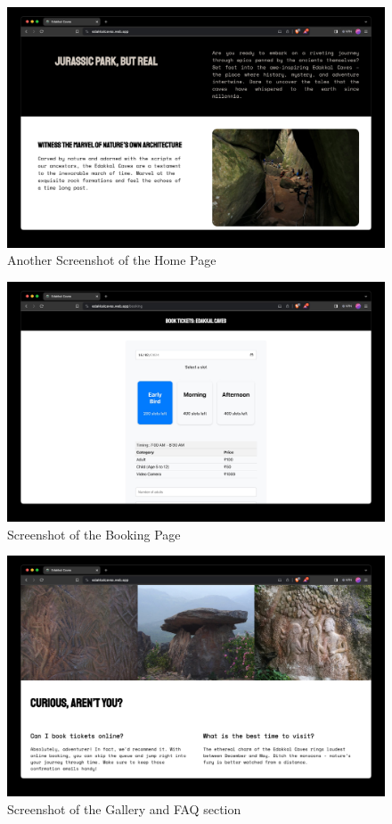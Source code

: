 \documentclass[12pt,a4paper]{report}
\begin{document}
\begin{figure}[htbp]
    \centering
    \includegraphics[width=1\textwidth]{screenshots/Home-2.jpg}
    \caption{Another Screenshot of the Home Page}
\end{figure}

\begin{figure}[htbp]
    \centering
    \includegraphics[width=1\textwidth]{screenshots/Booking.jpg}
    \caption{Screenshot of the Booking Page}
\end{figure}

\begin{figure}[htbp]
    \centering
    \includegraphics[width=1\textwidth]{screenshots/Gallery.jpg}
    \caption{Screenshot of the Gallery and FAQ section}
\end{figure}
\end{document}
